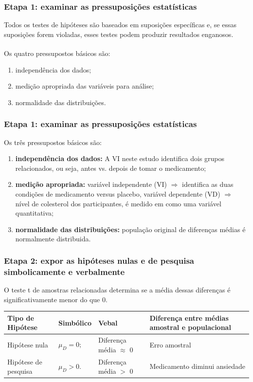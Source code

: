 \documentclass[11pt]{beamer}
\begin{document}
\begin{frame}
\frametitle{Etapa 1: examinar as pressuposições estatísticas}

Todos os testes de hipóteses são baseados em suposições específicas e, se essas suposições forem violadas, esses testes podem produzir resultados enganosos.\\~\\
Os quatro pressupostos básicos são:

\begin{enumerate}
\item independência dos dados;
\item medição apropriada das variáveis para análise;
\item normalidade das distribuições.
\end{enumerate}

\end{frame}

\begin{frame}
\frametitle{Etapa 1: examinar as pressuposições estatísticas}

Os três pressupostos básicos são:

\begin{enumerate}
\item \textbf{independência dos dados:} A VI neste estudo identifica dois grupos relacionados, ou seja, antes vs. depois de tomar o medicamento;
\item \textbf{medição apropriada:} variável independente (VI) \(\Rightarrow\) identifica as duas condições de medicamento versus placebo, variável dependente (VD) \(\Rightarrow\) nível de colesterol dos participantes, é medido em como uma variável quantitativa;
\item \textbf{normalidade das distribuições:} população original de diferenças médias é normalmente distribuida.
\end{enumerate}

\end{frame}

\begin{frame}
\frametitle{Etapa 2: expor as hipóteses nulas e de pesquisa simbolicamente e verbalmente}

O teste t de amostras relacionadas determina se a média dessas diferenças é significativamente menor do que 0.

\begin{center}
\begin{tabular}{ m{2cm}|m{2cm}|m{3cm}|m{3cm} } 
 \hline
 Tipo de Hipótese & Simbólico & Vebal & Diferença entre médias amostral e populacional\\
  \hline
 Hipótese nula & $\mu_{D}=0;$ & Diferença média $\approx$ 0 & Erro amostral \\ 
 Hipótese de pesquisa & $\mu_{D} > 0.$ & Diferença média $>$ 0 & Medicamento diminui ansiedade  \\ 
 \hline
 \hline
\end{tabular}
\end{center}

\end{frame}
\end{document}
